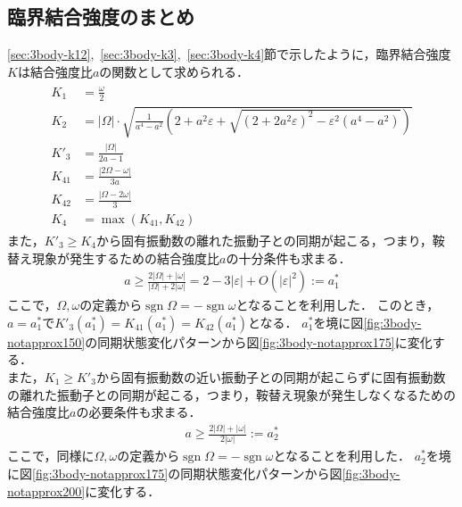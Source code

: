 \documentclass[../main]{subfiles}
\begin{document}
    \subsection{臨界結合強度のまとめ}
    \label{sec:3body-summary}
    \ref{sec:3body-k12},\ \ref{sec:3body-k3},\ \ref{sec:3body-k4}節で示したように，臨界結合強度$K$は結合強度比$a$の関数として求められる．
    \begin{align}
        \label{eq:3body-matome}
        \begin{split}
            K_1&=\frac{\omega}{2}\\
            K_2&=|\Omega|\cdot\sqrt{\frac{1}{a^4-a^2}\left(2+a^2\varepsilon+\sqrt{(2+2a^2\varepsilon)^2-\varepsilon^2(a^4-a^2)}\right)}\\
            K'_3&=\frac{|\Omega|}{2a-1}\\
            K_{41}&=\frac{|2\Omega-\omega|}{3a}\\
            K_{42}&=\frac{|\Omega-2\omega|}{3}\\
            K_4&=\max\left(K_{41},K_{42}\right)
        \end{split}
    \end{align}
    また，$K'_3\geq K_4$から固有振動数の離れた振動子との同期が起こる，つまり，鞍替え現象が発生するための結合強度比$a$の十分条件も求まる．
    \begin{align*}
        a\geq \frac{2|\Omega|+|\omega|}{|\Omega|+2|\omega|}= 2-3|\varepsilon|+O(|\varepsilon|^2):=a^\ast_1    
    \end{align*}
    ここで，$\Omega,\omega$の定義から$\operatorname{sgn}\Omega=-\operatorname{sgn}\omega$となることを利用した．
    このとき，$a=a^\ast_1$で$K'_{3}(a^\ast_1)=K_{41}(a^\ast_1)=K_{42}(a^\ast_1)$となる．
    $a^\ast_1$を境に図\ref{fig:3body-notapprox150}の同期状態変化パターンから図\ref{fig:3body-notapprox175}に変化する．\\
    また，$K_1\geq K'_3$から固有振動数の近い振動子との同期が起こらずに固有振動数の離れた振動子との同期が起こる，つまり，鞍替え現象が発生しなくなるための結合強度比$a$の必要条件も求まる．
    \begin{align*}
        a\geq \frac{2|\Omega|+|\omega|}{2|\omega|}:=a^\ast_2    
    \end{align*}
    ここで，同様に$\Omega,\omega$の定義から$\operatorname{sgn}\Omega=-\operatorname{sgn}\omega$となることを利用した．
    $a^\ast_2$を境に図\ref{fig:3body-notapprox175}の同期状態変化パターンから図\ref{fig:3body-notapprox200}に変化する．
\end{document}
